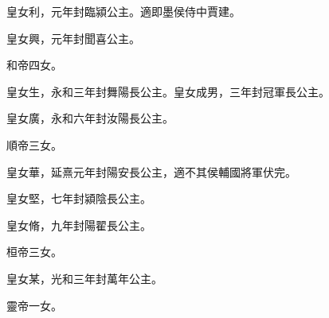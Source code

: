 \begin{pinyinscope}
皇女利，元年封臨潁公主。適即墨侯侍中賈建。

皇女興，元年封聞喜公主。

和帝四女。

皇女生，永和三年封舞陽長公主。皇女成男，三年封冠軍長公主。

皇女廣，永和六年封汝陽長公主。

順帝三女。

皇女華，延熹元年封陽安長公主，適不其侯輔國將軍伏完。

皇女堅，七年封潁陰長公主。

皇女脩，九年封陽翟長公主。

桓帝三女。

皇女某，光和三年封萬年公主。

靈帝一女。


\end{pinyinscope}